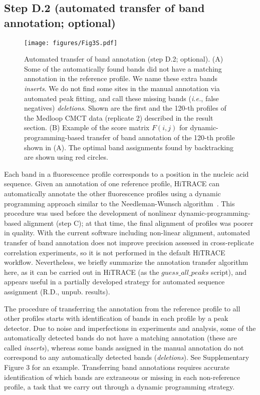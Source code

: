 \documentclass[letter]{bioinfo}
\newcommand{\ie}{{\it i.e.}}
\begin{document}
\subsection{Step D.2 (automated transfer of band annotation; optional)}
\begin{figure}
\centering
    \texttt{[image: figures/Fig3S.pdf]}
\caption{Automated transfer of band annotation (step D.2; optional). (A) Some of the automatically found bands did not have a matching annotation in the reference profile. We name these extra bands \emph{inserts}. We do not find some sites in the manual annotation via automated peak fitting, and call these missing bands (\ie, false negatives) \emph{deletions}. Shown are the first and the 120-th profiles of the Medloop CMCT data (replicate 2) described in the result section. (B) Example of the score matrix $F(i,j)$ for dynamic-programming-based transfer of band annotation of the 120-th profile shown in (A). The optimal band assignments found by backtracking are shown using red circles.}
\label{f:auto-anno}
\end{figure}

Each band in a fluorescence profile corresponds to a position in the nucleic acid sequence. Given an annotation of one reference profile, HiTRACE can automatically annotate the other fluorescence profiles using a dynamic programming approach similar to the Needleman-Wunsch algorithm~\citep{needleman1970general}. This procedure was used before the development of nonlinear dynamic-programming-based alignment (step C); at that time, the final alignment of profiles was poorer in quality. With the current software including non-linear alignment, automated transfer of band annotation does not improve precision assessed in cross-replicate correlation experiments, so it is not performed in the default HiTRACE workflow. Nevertheless, we briefly summarize the annotation transfer algorithm here, as it can be carried out in HiTRACE (as the $guess\_all\_peaks$ script), and appears useful in a partially developed strategy for automated sequence assignment (R.D., unpub. results).

The procedure of transferring the annotation from the reference profile to all other profiles starts with identification of bands in each profile by a peak detector. Due to noise and imperfections in experiments and analysis, some of the automatically detected bands do not have a matching annotation (these are called \emph{inserts}), whereas some bands assigned in the manual annotation do not correspond to any automatically detected bands (\emph{deletions}). See Supplementary Figure 3 for an example. Transferring band annotations requires accurate identification of which bands are extraneous or missing in each non-reference profile, a task that we carry out through a dynamic programming strategy.
\end{document}
